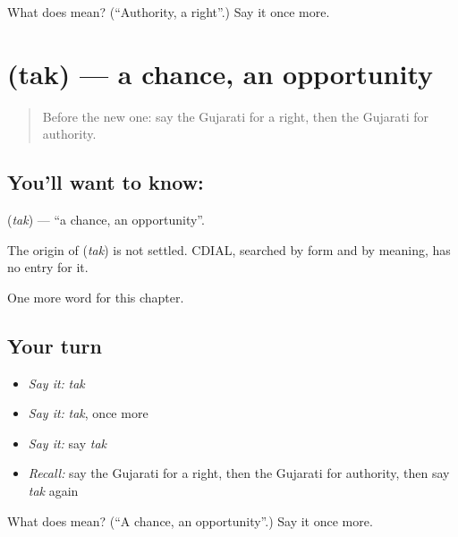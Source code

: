 \begin{tcolorbox}[breakable,colback=teal!4,colframe=teal!35!black,title={Before you move on}]
What does  mean? (\textquotedblleft{}Authority, a right\textquotedblright{}.) Say it once more.
\end{tcolorbox}
\section[\texorpdfstring{\gu{તક} (tak)}{તક (tak)}]{ (tak) — a chance, an opportunity}

\label{lesson:GU-C103-tak}



\begin{quote}
Before the new one: say the Gujarati for a right, then the Gujarati for authority.
\end{quote}

\subsection*{You'll want to know: }
\textbf{} (\emph{tak}) — \textquotedblleft{}a chance, an opportunity\textquotedblright{}.

\begin{cousinweb}
The origin of \textbf{} (\emph{tak}) is not settled. CDIAL, searched by form and by meaning, has no entry for it.
\end{cousinweb}

\begin{grammarlens}[title={What you've built}]
One more word for this chapter.
\end{grammarlens}

\subsection*{Your turn}
\begin{itemize}
\raggedright
  \item \emph{Say it:} \emph{tak}
  \item \emph{Say it:} \emph{tak}, once more
  \item \emph{Say it:} say \emph{tak}
  \item \emph{Recall:} say the Gujarati for a right, then the Gujarati for authority, then say \emph{tak} again
\end{itemize}

\begin{tcolorbox}[breakable,colback=teal!4,colframe=teal!35!black,title={Before you move on}]
What does  mean? (\textquotedblleft{}A chance, an opportunity\textquotedblright{}.) Say it once more.
\end{tcolorbox}
